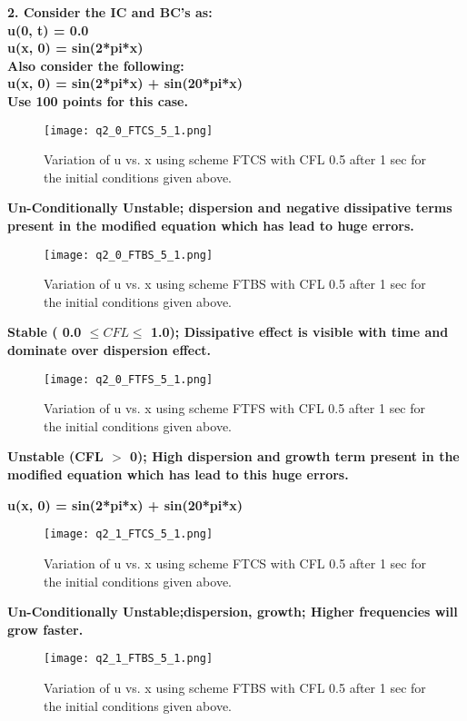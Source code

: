 \documentclass{article}
\begin{document}
\newpage
\textbf{2. Consider the IC and BC's as:
\\u(0, t) = 0.0
\\u(x, 0) = sin(2*pi*x)
\\Also consider the following:
\\u(x, 0) = sin(2*pi*x) + sin(20*pi*x)
\\Use 100 points for this case.}

\begin{figure}[H] \label{figure}
\texttt{[image: q2\_0\_FTCS\_5\_1.png]}
\caption{Variation of u vs. x using scheme FTCS with CFL 0.5 after 1 sec for the initial conditions given above.}
\label{figure:}
\end{figure}
\textbf{Un-Conditionally Unstable; dispersion and negative dissipative terms present in the modified equation which has lead to huge errors.} 

\begin{figure}[H] \label{figure}
\texttt{[image: q2\_0\_FTBS\_5\_1.png]}
\caption{Variation of u vs. x using scheme FTBS with CFL 0.5 after 1 sec for the initial conditions given above.}
\label{figure:}
\end{figure}

\textbf{ Stable ( 0.0 $\le CFL \le$ 1.0); Dissipative effect is visible with time and dominate over dispersion effect.}

\begin{figure}[H] \label{figure}
\texttt{[image: q2\_0\_FTFS\_5\_1.png]}
\caption{Variation of u vs. x using scheme FTFS with CFL 0.5 after 1 sec for the initial conditions given above.}
\label{figure:}
\end{figure}

\textbf{Unstable (CFL $>$ 0); High dispersion and growth term present in the modified equation which has lead to this huge errors.}

\textbf{u(x, 0) = sin(2*pi*x) + sin(20*pi*x)}
\begin{figure}[H] \label{figure}
\texttt{[image: q2\_1\_FTCS\_5\_1.png]}
\caption{Variation of u vs. x using scheme FTCS with CFL 0.5 after 1 sec for the initial conditions given above.}
\label{figure:}
\end{figure}

\textbf{Un-Conditionally Unstable;dispersion, growth; Higher frequencies will grow faster.}
\begin{figure}[H] \label{figure}
\texttt{[image: q2\_1\_FTBS\_5\_1.png]}
\caption{Variation of u vs. x using scheme FTBS with CFL 0.5 after 1 sec for the initial conditions given above.}
\label{figure:}
\end{figure}
\end{document}
